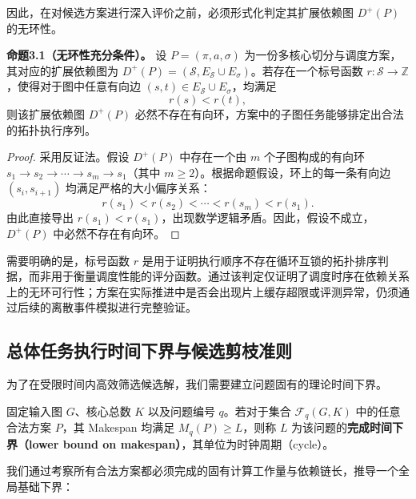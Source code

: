 \documentclass[anonymous,notoc]{gmcm2026}
\begin{document}
因此，在对候选方案进行深入评价之前，必须形式化判定其扩展依赖图 \(D^+(P)\) 的无环性。

\textbf{命题3.1（无环性充分条件）。} 设 \(P = (\pi, a, \sigma)\) 为一份多核心切分与调度方案，其对应的扩展依赖图为 \(D^+(P) = (\mathcal{S}, E_{\mathcal{S}} \cup E_\sigma)\)。若存在一个标号函数 \(r: \mathcal{S} \to \mathbb{Z}\)，使得对于图中任意有向边 \((s, t) \in E_{\mathcal{S}} \cup E_\sigma\)，均满足 \begin{equation}
r(s) < r(t),
\end{equation} 则该扩展依赖图 \(D^+(P)\) 必然不存在有向环，方案中的子图任务能够排定出合法的拓扑执行序列。

\begin{proof} 采用反证法。假设 \(D^+(P)\) 中存在一个由 \(m\) 个子图构成的有向环 \(s_1 \to s_2 \to \cdots \to s_m \to s_1\)（其中 \(m \ge 2\)）。根据命题假设，环上的每一条有向边 \((s_i, s_{i+1})\) 均满足严格的大小偏序关系： \begin{equation}
r(s_1) < r(s_2) < \cdots < r(s_m) < r(s_1).
\end{equation} 由此直接导出 \(r(s_1) < r(s_1)\)，出现数学逻辑矛盾。因此，假设不成立，\(D^+(P)\) 中必然不存在有向环。 \end{proof}

需要明确的是，标号函数 \(r\) 是用于证明执行顺序不存在循环互锁的拓扑排序判据，而非用于衡量调度性能的评分函数。通过该判定仅证明了调度时序在依赖关系上的无环可行性；方案在实际推进中是否会出现片上缓存超限或评测异常，仍须通过后续的离散事件模拟进行完整验证。

\subsection{总体任务执行时间下界与候选剪枝准则}

为了在受限时间内高效筛选候选解，我们需要建立问题固有的理论时间下界。

固定输入图 \(G\)、核心总数 \(K\) 以及问题编号 \(q\)。若对于集合 \(\mathcal{F}_q(G, K)\) 中的任意合法方案 \(P\)，其 Makespan 均满足 \(M_q(P) \ge L\)，则称 \(L\) 为该问题的\textbf{完成时间下界（lower bound on makespan）}，其单位为时钟周期（cycle）。

我们通过考察所有合法方案都必须完成的固有计算工作量与依赖链长，推导一个全局基础下界：
\end{document}
